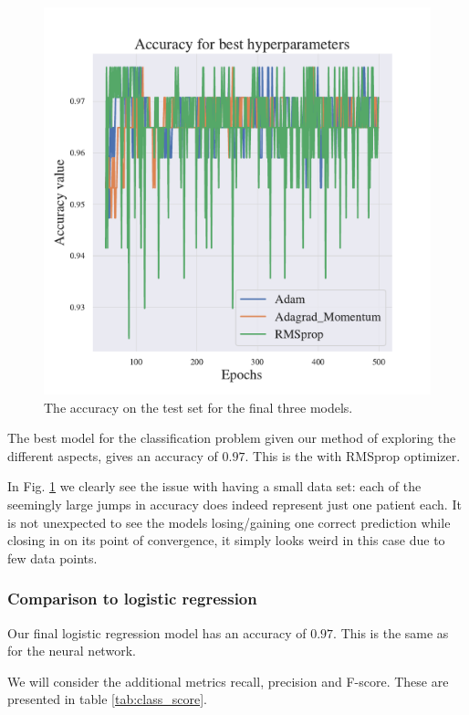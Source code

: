 \begin{figure}[h!]
    \centering
    \includegraphics[width=1.0\linewidth]{project_2/figures/best_classification.pdf}
    \caption{The accuracy on the test set for the final three models.}
    \label{fig:best_cancer}
\end{figure}

The best model for the classification problem given our method of exploring the different aspects, gives an accuracy of $0.97$.
This is the with RMSprop optimizer. 

In Fig. \ref{fig:best_cancer} we clearly see the issue with having a small data set: each of the seemingly large jumps in accuracy does indeed represent just one patient each.
It is not unexpected to see the models losing/gaining one correct prediction while closing in on its point of convergence, it simply looks weird in this case due to few data points.

\subsubsection{Comparison to logistic regression}

Our final logistic regression model has an accuracy of $0.97$. This is the same as for the neural network. 

We will consider the additional metrics recall, precision and F-score. These are presented in table \ref{tab:class_score}.

